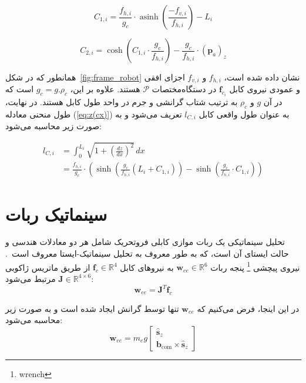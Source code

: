 \begin{equation}  \label{eq:C1}
	C_{1,i} = \frac{f_{h,i}}{g_c} \cdot \operatorname{asinh} \left( \frac{-f_{v,i}}{f_{h,i}} \right) - L_i  
\end{equation}

\begin{equation}  \label{eq:C2}
	C_{2,i} = \cosh \left(C_{1,i} \cdot \frac{g_c}{f_{h,i}} \right) - \frac{g_c}{f_{h,i}} \cdot (\bm{p}_a)_z
\end{equation}

همانطور که در شکل~\ref{fig:frame_robot} نشان داده شده است، $f_{h,i}$ و $f_{v,i}$ اجزای افقی و عمودی نیروی کابل $\mathbf{f}_{c_i}$ در دستگاه‌مختصات $\mathcal{P}$ هستند. علاوه بر این، $g_c=g.\rho_c$ است که در آن $g$ و $\rho_c$ به ترتیب شتاب گرانشی و جرم در واحد طول کابل هستند. در نهایت، طول منحنی معادله (\ref{eq:z(cx)}) به عنوان طول واقعی کابل $l_{C,i}$ تعریف می‌شود و به صورت زیر محاسبه می‌شود:

\begin{equation}  \label{eq:lcat}
	\begin{aligned}
		l_{C,i} &= \int_0^{L_i} \sqrt{1 + \left(\frac{dz}{dx}\right)^2} \, dx \\ &= \frac{f_{h,i}}{g_c} \cdot \left( \sinh \left( \frac{g_c}{f_{h,i}} (L_i + C_{1,i}) \right) - \sinh \left( \frac{g_c}{f_{h,i}} \cdot C_{1,i} \right) \right) 
	\end{aligned}
\end{equation}


\section{سینماتیک ربات}   
تحلیل سینماتیکی یک ربات موازی کابلی فروتحریک شامل هر دو معادلات هندسی و حالت ایستای آن است، که به طور معروف به تحلیل سینماتیک-ایستا معروف است~\cite{carricato2013direct}. نیروی پیچشی
\footnote{wrench}
 پنجه ربات
 $\mathbf{w}_{ee} \in \mathbb{R}^6$ 
به نیروهای کابل $\mathbf{f}_c \in \mathbb{R}^4 $ از طریق ماتریس ژاکوبی $\bm{J} \in \mathbb{R}^{4\times6}$ مرتبط می‌شود:
\begin{equation} \label{eq:static}
	\mathbf{w}_{ee} = \bm{J}^T \mathbf{f}_{c}  
\end{equation}


در این اینجا، فرض می‌کنیم که $\mathbf{w}_{ee}$ تنها توسط گرانش ایجاد شده است و به صورت زیر محاسبه می‌شود:
\begin{equation} \label{eq:example}
	\mathbf{w}_{ee} = m_{e}g \begin{bmatrix} \hat{\bm{s}}_z \\ \bm{b}_{\text{com}} \times \hat{\bm{s}}_z \end{bmatrix}
\end{equation}

